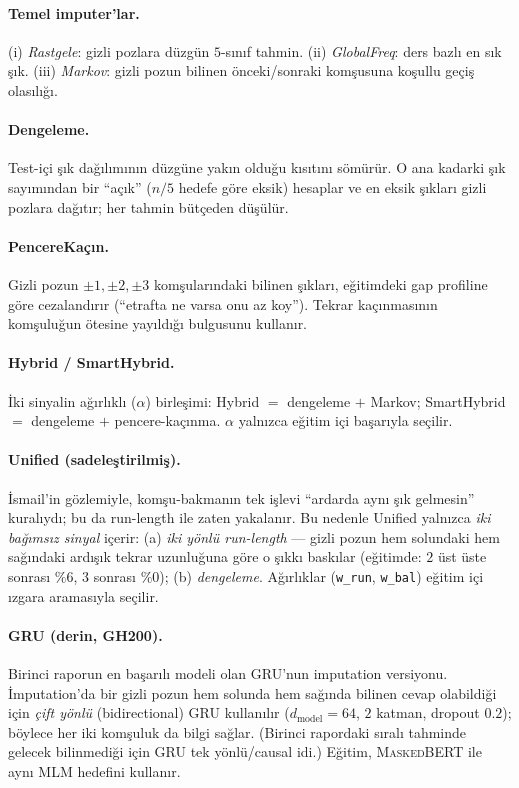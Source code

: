 \documentclass[11pt]{article}
\begin{document}
\paragraph{Temel imputer'lar.} (i) \emph{Rastgele}: gizli pozlara düzgün
$5$-sınıf tahmin. (ii) \emph{GlobalFreq}: ders bazlı en sık şık. (iii)
\emph{Markov}: gizli pozun bilinen önceki/sonraki komşusuna koşullu geçiş
olasılığı.

\paragraph{Dengeleme.} Test-içi şık dağılımının düzgüne yakın olduğu kısıtını
sömürür. O ana kadarki şık sayımından bir ``açık'' ($n/5$ hedefe göre eksik)
hesaplar ve en eksik şıkları gizli pozlara dağıtır; her tahmin bütçeden
düşülür.

\paragraph{PencereKaçın.} Gizli pozun $\pm 1, \pm 2, \pm 3$ komşularındaki
bilinen şıkları, eğitimdeki gap profiline göre cezalandırır (``etrafta ne
varsa onu az koy''). Tekrar kaçınmasının komşuluğun ötesine yayıldığı bulgusunu
kullanır.

\paragraph{Hybrid / SmartHybrid.} İki sinyalin ağırlıklı ($\alpha$)
birleşimi: Hybrid $=$ dengeleme $+$ Markov; SmartHybrid $=$ dengeleme $+$
pencere-kaçınma. $\alpha$ yalnızca eğitim içi başarıyla seçilir.

\paragraph{Unified (sadeleştirilmiş).} İsmail'in gözlemiyle, komşu-bakmanın
tek işlevi ``ardarda aynı şık gelmesin'' kuralıydı; bu da run-length ile
zaten yakalanır. Bu nedenle Unified yalnızca \emph{iki bağımsız sinyal}
içerir: (a) \emph{iki yönlü run-length} --- gizli pozun hem solundaki hem
sağındaki ardışık tekrar uzunluğuna göre o şıkkı baskılar (eğitimde:
$2$ üst üste sonrası $\%6$, $3$ sonrası $\%0$); (b) \emph{dengeleme}.
Ağırlıklar (\texttt{w\_run}, \texttt{w\_bal}) eğitim içi ızgara aramasıyla
seçilir.

\paragraph{GRU (derin, GH200).} Birinci raporun en başarılı modeli olan
GRU'nun imputation versiyonu. İmputation'da bir gizli pozun hem solunda hem
sağında bilinen cevap olabildiği için \emph{çift yönlü} (bidirectional) GRU
kullanılır ($d_{\text{model}}=64$, $2$ katman, dropout $0.2$); böylece her iki
komşuluk da bilgi sağlar. (Birinci rapordaki sıralı tahminde gelecek bilinmediği
için GRU tek yönlü/causal idi.) Eğitim, \textsc{MaskedBERT} ile aynı MLM
hedefini kullanır.
\end{document}
